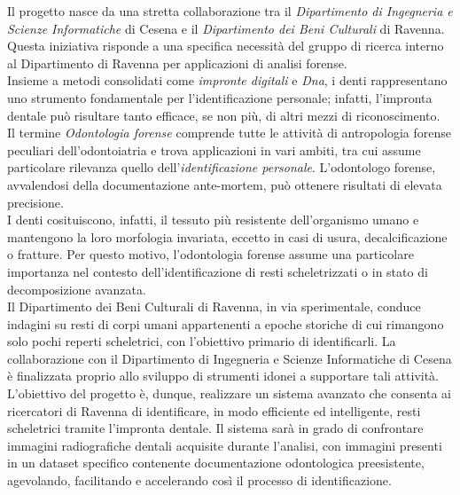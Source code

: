 \documentclass[12pt,a4paper,openright,twoside]{book}
\begin{document}
Il progetto nasce da una stretta collaborazione tra il {\itshape Dipartimento di Ingegneria e Scienze Informatiche} di Cesena e il {\itshape Dipartimento dei Beni Culturali} di Ravenna. Questa iniziativa risponde a una specifica necessità del gruppo di ricerca interno al Dipartimento di Ravenna per applicazioni di analisi forense.\\

Insieme a metodi consolidati come {\itshape impronte digitali} e {\itshape Dna}, i denti rappresentano uno strumento fondamentale per l'identificazione personale; infatti, l’impronta dentale può risultare tanto efficace, se non più, di altri mezzi di riconoscimento.\\

Il termine {\itshape Odontologia forense} comprende tutte le attività di antropologia forense peculiari dell’odontoiatria e trova applicazioni in vari ambiti, tra cui assume particolare rilevanza quello dell'{\itshape identificazione personale}. L’odontologo forense, avvalendosi della documentazione ante-mortem, può ottenere risultati di elevata precisione.\\

I denti cosituiscono, infatti, il tessuto più resistente dell’organismo umano e mantengono la loro morfologia invariata, eccetto in casi di usura, decalcificazione o fratture. Per questo motivo, l’odontologia forense assume una particolare importanza nel contesto dell’identificazione di resti scheletrizzati o in stato di decomposizione avanzata.\\

Il Dipartimento dei Beni Culturali di Ravenna, in via sperimentale, conduce indagini su resti di corpi umani appartenenti a epoche storiche di cui rimangono solo pochi reperti scheletrici, con l’obiettivo primario di identificarli. La collaborazione con il Dipartimento di Ingegneria e Scienze Informatiche di Cesena è finalizzata proprio allo sviluppo di strumenti idonei a supportare tali attività.\\

L'obiettivo del progetto è, dunque, realizzare un sistema avanzato che consenta ai ricercatori di Ravenna di identificare, in modo efficiente ed intelligente, resti scheletrici tramite l'impronta dentale. Il sistema sarà in grado di confrontare immagini radiografiche dentali acquisite durante l’analisi, con immagini presenti in un dataset specifico contenente documentazione odontologica preesistente, agevolando, facilitando e accelerando così il processo di identificazione.
\end{document}
